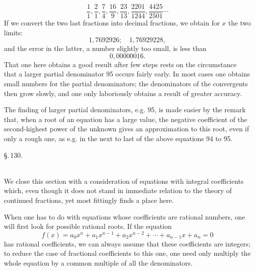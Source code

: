\[
\frac{1}{1}, \frac{2}{1}, \frac{7}{4}, \frac{16}{9}, \frac{23}{13}, \frac{2201}{1244}, \frac{4425}{2501} \cdots
\]
If we convert the two last fractions into decimal fractions, we obtain for $x$ the two limits:
\[
1{,}7692926; \quad 1{,}76929228,
\]
and the error in the latter, a number slightly too small, is less than
\[
0{,}00000016.
\]
That one here obtains a good result after few steps rests on the circumstance that a larger partial denominator 95 occurs fairly early. In most cases one obtains small numbers for the partial denominators; the denominators of the convergents then grow slowly, and one only laboriously obtains a result of greater accuracy.

The finding of larger partial denominators, e.g. 95, is made easier by the remark that, when a root of an equation has a large value, the negative coefficient of the second-highest power of the unknown gives an approximation to this root, even if only a rough one, as e.g. in the next to last of the above equations 94 to 95.

\begin{center}
\S.\,130.\\[0.3em]
\\
\end{center}

We close this section with a consideration of equations with integral coefficients which, even though it does not stand in immediate relation to the theory of continued fractions, yet most fittingly finds a place here.

When one has to do with equations whose coefficients are rational numbers, one will first look for possible rational roots. If the equation
\[
f(x) = a_0 x^n + a_1 x^{n-1} + a_2 x^{n-2} + \cdots + a_{n-1} x + a_n = 0
\]
has rational coefficients, we can always assume that these coefficients are integers; to reduce the case of fractional coefficients to this one, one need only multiply the whole equation by a common multiple of all the denominators.
